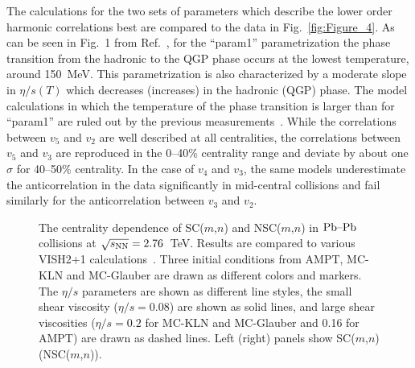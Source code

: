 The calculations for the two sets of parameters which describe the lower order harmonic correlations best are compared to the data in Fig.~\ref{fig:Figure_4}. 
As can be seen in Fig.~1 from Ref.~\cite{Niemi:2015qia}, for the ``param1'' parametrization the phase transition from the hadronic to the QGP phase occurs at the lowest temperature, around 150~MeV. This parametrization is also characterized by a moderate slope in $\eta/s(T)$ which decreases (increases) in the hadronic (QGP) phase.
The model calculations in which the temperature of the phase transition is larger than for ``param1'' are ruled out by the previous measurements~\cite{ALICE:2016kpq}.
While the correlations between $v_5$ and $v_2$ are well described at all centralities, the correlations between $v_5$ and $v_3$ are reproduced in the 0--40\% centrality range and deviate by about one $\sigma$ for 40--50\% centrality.
In the case of $v_4$ and $v_3$, the same models underestimate the anticorrelation in the data significantly in mid-central collisions and fail similarly for the anticorrelation between $v_3$ and $v_2$.

\begin{figure}[t!]
	\begin{center}
        \caption{The centrality dependence of SC($m$,$n$) and NSC($m$,$n$) in $\textnormal{Pb--Pb}$ collisions at $\sqrt{s_{\textnormal{NN}}}=2.76$~TeV. Results are compared to various VISH2+1 calculations~\cite{Zhu:2016puf}. Three initial conditions from AMPT, MC-KLN and MC-Glauber are drawn as different colors and markers. The $\eta/s$ parameters are shown as different line styles, the small shear viscosity ($\eta/s=0.08$) are shown as solid lines, and large shear viscosities ($\eta/s=0.2$ for MC-KLN and MC-Glauber and 0.16 for AMPT) are drawn as dashed lines. Left (right) panels show SC($m$,$n$)  (NSC($m$,$n$)).}
        \label{fig:Figure_5}
        \end{center}   
 \end{figure}
 

